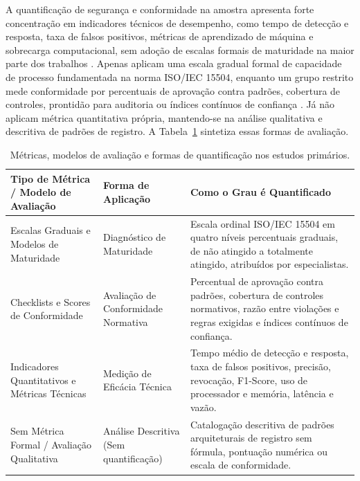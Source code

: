 A quantificação de segurança e conformidade na amostra apresenta forte concentração em indicadores técnicos de desempenho, como tempo de detecção e resposta, taxa de falsos positivos, métricas de aprendizado de máquina e sobrecarga computacional, sem adoção de escalas formais de maturidade na maior parte dos trabalhos \cite{darwesh2024,jin2025,joshisegireddy2026,acosta2025,setiawan2025}. Apenas  aplicam uma escala gradual formal de capacidade de processo fundamentada na norma ISO/IEC 15504, enquanto um grupo restrito mede conformidade por percentuais de aprovação contra padrões, cobertura de controles, prontidão para auditoria ou índices contínuos de confiança \cite{bungei2026,shao2026a,velasquez2025,devarajulu2025,mahida2026,enaw2018,shao2026b}. Já  não aplicam métrica quantitativa própria, mantendo-se na análise qualitativa e descritiva de padrões de registro. A Tabela~\ref{tab:rsl_qs08} sintetiza essas formas de avaliação.

\begin{table}[!htbp]
    \centering
    \caption{Métricas, modelos de avaliação e formas de quantificação nos estudos primários.}
    \label{tab:rsl_qs08}
    \footnotesize
    \begin{tabular}{p{3.5cm}p{3.1cm}p{7.4cm}}
        \hline
        \textbf{Tipo de Métrica / Modelo de Avaliação} & \textbf{Forma de Aplicação} & \textbf{Como o Grau é Quantificado} \\ \hline
        Escalas Graduais e Modelos de Maturidade & Diagnóstico de Maturidade & Escala ordinal ISO/IEC 15504 em quatro níveis percentuais graduais, de não atingido a totalmente atingido, atribuídos por especialistas. \\ \hline
        Checklists e Scores de Conformidade & Avaliação de Conformidade Normativa & Percentual de aprovação contra padrões, cobertura de controles normativos, razão entre violações e regras exigidas e índices contínuos de confiança. \\ \hline
        Indicadores Quantitativos e Métricas Técnicas & Medição de Eficácia Técnica & Tempo médio de detecção e resposta, taxa de falsos positivos, precisão, revocação, F1-Score, uso de processador e memória, latência e vazão. \\ \hline
        Sem Métrica Formal / Avaliação Qualitativa & Análise Descritiva (Sem quantificação) & Catalogação descritiva de padrões arquiteturais de registro sem fórmula, pontuação numérica ou escala de conformidade. \\ \hline
    \end{tabular}
\end{table}
\FloatBarrier

